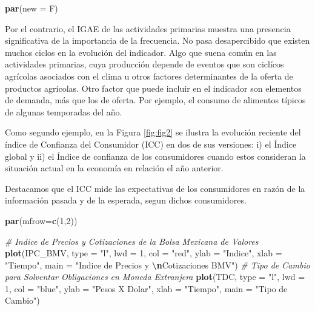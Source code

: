 \documentclass[
]{book}
\newenvironment{Shaded}{\begin{snugshade}}{\end{snugshade}}
\newcommand{\AttributeTok}[1]{\textcolor[rgb]{0.13,0.29,0.53}{#1}}
\newcommand{\CommentTok}[1]{\textcolor[rgb]{0.56,0.35,0.01}{\textit{#1}}}
\newcommand{\DecValTok}[1]{\textcolor[rgb]{0.00,0.00,0.81}{#1}}
\newcommand{\FunctionTok}[1]{\textcolor[rgb]{0.13,0.29,0.53}{\textbf{#1}}}
\newcommand{\NormalTok}[1]{#1}
\newcommand{\SpecialCharTok}[1]{\textcolor[rgb]{0.81,0.36,0.00}{\textbf{#1}}}
\newcommand{\StringTok}[1]{\textcolor[rgb]{0.31,0.60,0.02}{#1}}
\begin{document}
\begin{Shaded}
\begin{Highlighting}[]
\FunctionTok{par}\NormalTok{(}\AttributeTok{new =}\NormalTok{ F)}
\end{Highlighting}
\end{Shaded}

Por el contrario, el IGAE de las actividades primarias muestra una presencia significativa de la importancia de la frecuencia. No pasa desapercibido que existen muchos ciclos en la evolución del indicador. Algo que suena común en las actividades primarias, cuya producción depende de eventos que son ciclícos agrícolas asociados con el clima u otros factores determinantes de la oferta de productos agrícolas. Otro factor que puede incluir en el indicador son elementos de demanda, más que los de oferta. Por ejemplo, el consumo de alimentos típicos de algunas temporadas del año.

Como segundo ejemplo, en la Figura \ref{fig:fig2} se ilustra la evolución reciente del índice de Confianza del Consumidor (ICC) en dos de sus versiones: i) el Índice global y ii) el Índice de confianza de los consumidores cuando estos consideran la situación actual en la economía en relación el año anterior.

Destacamos que el ICC mide las expectativas de los consumidores en razón de la información pasada y de la esperada, segun dichos consumidores.

\begin{Shaded}
\begin{Highlighting}[]
\FunctionTok{par}\NormalTok{(}\AttributeTok{mfrow=}\FunctionTok{c}\NormalTok{(}\DecValTok{1}\NormalTok{,}\DecValTok{2}\NormalTok{))}

\CommentTok{\# Indice de Precios y Cotizaciones de la Bolsa Mexicana de Valores}
\FunctionTok{plot}\NormalTok{(IPC\_BMV, }\AttributeTok{type =} \StringTok{"l"}\NormalTok{, }\AttributeTok{lwd =} \DecValTok{1}\NormalTok{, }\AttributeTok{col =} \StringTok{"red"}\NormalTok{, }\AttributeTok{ylab =} \StringTok{"Indice"}\NormalTok{, }
     \AttributeTok{xlab =} \StringTok{"Tiempo"}\NormalTok{, }\AttributeTok{main =} \StringTok{"Indice de Precios y }\SpecialCharTok{\textbackslash{}n}\StringTok{Cotizaciones BMV"}\NormalTok{)}
\CommentTok{\# Tipo de Cambio para Solventar Obligaciones en Moneda Extranjera}
\FunctionTok{plot}\NormalTok{(TDC, }\AttributeTok{type =} \StringTok{"l"}\NormalTok{, }\AttributeTok{lwd =} \DecValTok{1}\NormalTok{, }\AttributeTok{col =} \StringTok{"blue"}\NormalTok{, }\AttributeTok{ylab =} \StringTok{"Pesos X Dolar"}\NormalTok{, }
     \AttributeTok{xlab =} \StringTok{"Tiempo"}\NormalTok{, }\AttributeTok{main =} \StringTok{"Tipo de Cambio"}\NormalTok{)}
\end{Highlighting}
\end{Shaded}
\end{document}
